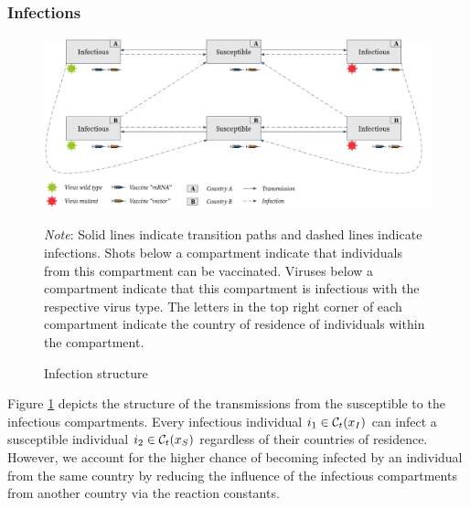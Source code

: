 \subsubsection{Infections}
\begin{figure}[h!]
\centering
\includegraphics[scale=0.3]{images/overview_infection.png}\\
\begin{flushleft}
\scriptsize{\textit{Note}: Solid lines indicate transition paths and dashed lines indicate infections. Shots below a compartment indicate that individuals from this compartment can be vaccinated. Viruses below a compartment indicate that this compartment is infectious with the respective virus type. The letters in the top right corner of each compartment indicate the country of residence of individuals within the compartment.}
\end{flushleft}
\caption{Infection structure}
\label{fig:model_infections}
\end{figure}
Figure \ref{fig:model_infections} depicts the structure of the transmissions from the susceptible to the infectious compartments. Every infectious individual $i_1 \in \mathcal{C}_t(x_I)$ can infect a susceptible individual $i_2 \in \mathcal{C}_t(x_S)$ regardless of their countries of residence. However, we account for the higher chance of becoming infected by an individual from the same country by reducing the influence of the infectious compartments from another country via the reaction constants. \\


